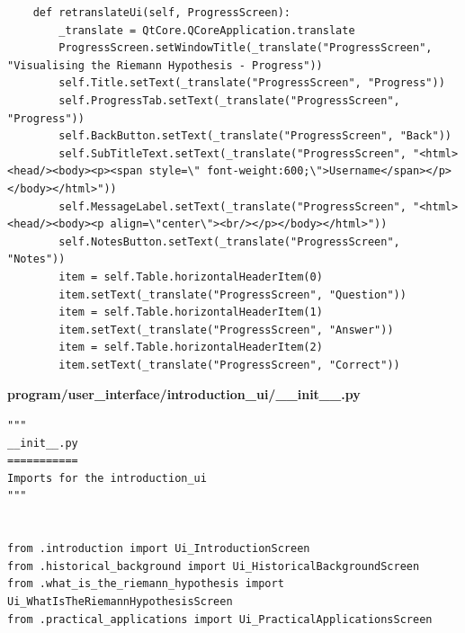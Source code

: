 \documentclass{article}
\begin{document}
\begin{lstlisting}
    def retranslateUi(self, ProgressScreen):
        _translate = QtCore.QCoreApplication.translate
        ProgressScreen.setWindowTitle(_translate("ProgressScreen", "Visualising the Riemann Hypothesis - Progress"))
        self.Title.setText(_translate("ProgressScreen", "Progress"))
        self.ProgressTab.setText(_translate("ProgressScreen", "Progress"))
        self.BackButton.setText(_translate("ProgressScreen", "Back"))
        self.SubTitleText.setText(_translate("ProgressScreen", "<html><head/><body><p><span style=\" font-weight:600;\">Username</span></p></body></html>"))
        self.MessageLabel.setText(_translate("ProgressScreen", "<html><head/><body><p align=\"center\"><br/></p></body></html>"))
        self.NotesButton.setText(_translate("ProgressScreen", "Notes"))
        item = self.Table.horizontalHeaderItem(0)
        item.setText(_translate("ProgressScreen", "Question"))
        item = self.Table.horizontalHeaderItem(1)
        item.setText(_translate("ProgressScreen", "Answer"))
        item = self.Table.horizontalHeaderItem(2)
        item.setText(_translate("ProgressScreen", "Correct"))
\end{lstlisting}

\textbf{program/user\_interface/introduction\_ui/\_\_init\_\_.py}
\begin{lstlisting}
"""
__init__.py
===========
Imports for the introduction_ui
"""


from .introduction import Ui_IntroductionScreen
from .historical_background import Ui_HistoricalBackgroundScreen
from .what_is_the_riemann_hypothesis import Ui_WhatIsTheRiemannHypothesisScreen
from .practical_applications import Ui_PracticalApplicationsScreen
\end{lstlisting}
\end{document}
